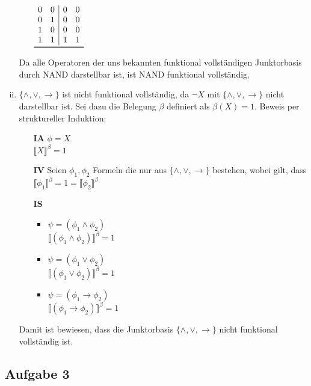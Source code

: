 \documentclass[a4paper,10pt]{article}
\begin{document}
\begin{enumerate}[(i)]
\begin{itemize}
\begin{math}
\begin{array}{cc|cc}
0 & 0 & 0 & 0 \\
0 & 1 & 0 & 0 \\
1 & 0 & 0 & 0 \\
1 & 1 & 1 & 1 \\
\bottomrule
\end{array}
\end{math}
\end{itemize}
Da alle Operatoren der uns bekannten funktional vollständigen Junktorbasis durch \textsf{NAND} darstellbar ist, ist \textsf{NAND} funktional vollständig.
\item $\{\land, \lor, \rightarrow \}$ ist nicht funktional vollständig, da $\lnot X$ mit $\{\land, \lor, \rightarrow \}$  nicht darstellbar ist. Sei dazu die Belegung $\beta$ definiert als $\beta(X) = 1$.
Beweis per struktureller Induktion:
\begin{itemize}
\item[\textbf{IA}] $\phi = X$ \\
$\llbracket X \rrbracket^{\beta} = 1$
\item[\textbf{IV}] Seien $\phi_1, \phi_2$ Formeln die nur aus   $\{\land, \lor, \rightarrow \}$ bestehen, wobei gilt, dass $\llbracket \phi_1 \rrbracket^{\beta} = 1 = \llbracket \phi_2 \rrbracket^{\beta} $
\item[\textbf{IS}] 
\begin{itemize}
\item $\psi = (\phi_1 \land \phi_2)$ \\
$\llbracket  (\phi_1 \land \phi_2) \rrbracket^\beta = 1$
\item $\psi = (\phi_1 \lor \phi_2)$ \\
$\llbracket  (\phi_1 \lor\phi_2) \rrbracket^\beta = 1$
\item $\psi = (\phi_1 \rightarrow \phi_2)$ \\
$\llbracket  (\phi_1 \rightarrow \phi_2) \rrbracket^\beta = 1$
\end{itemize}
\end{itemize}
Damit ist bewiesen, dass die Junktorbasis $\{\land, \lor, \rightarrow \}$ nicht funktional vollständig ist.
\end{enumerate}

\subsection*{Aufgabe 3}
\end{document}
